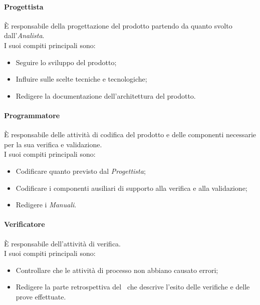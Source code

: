 \paragraph*{Progettista}
È responsabile della progettazione del prodotto partendo da quanto svolto dall'\textit{Analista}. \\
I suoi compiti principali sono:
\begin{itemize}
	\item Seguire lo sviluppo del prodotto;
	\item Influire sulle scelte tecniche e tecnologiche;
	\item Redigere la documentazione dell'architettura del prodotto.
\end{itemize}

\paragraph*{Programmatore}
È responsabile delle attività di codifica del prodotto e delle componenti necessarie per la sua verifica e validazione. \\
I suoi compiti principali sono:
\begin{itemize}
	\item Codificare quanto previsto dal \textit{Progettista};
	\item Codificare i componenti ausiliari di supporto alla verifica e alla validazione;
	\item Redigere i \textit{Manuali}.
\end{itemize}

\paragraph*{Verificatore}
È responsabile dell'attività di verifica. \\
I suoi compiti principali sono:
\begin{itemize}
	\item Controllare che le attività di processo non abbiano causato errori;
	\item Redigere la parte retrospettiva del \PdQv\ che descrive l'esito delle verifiche e delle prove effettuate.
\end{itemize}

